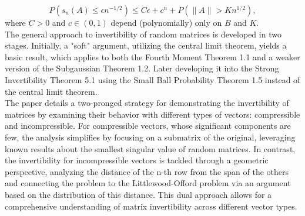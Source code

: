 \[P(s_n(A) \leq \epsilon n^{-1/2}) \leq C\epsilon + c^n + P(\|A\| > K n^{1/2}),\]
where \(C > 0\) and \(c \in (0, 1)\) depend (polynomially) only on \(B\) and \(K\).\\
The general approach to invertibility of random matrices is developed in two stages. Initially, a "soft" argument, utilizing the central limit theorem, yields a basic result, which applies to both the Fourth Moment Theorem 1.1 and a weaker version of the Subgaussian Theorem 1.2. Later developing it into the Strong Invertibility Theorem 5.1 using the Small Ball Probability Theorem 1.5 instead of the central limit theorem.\\
The paper details a two-pronged strategy for demonstrating the invertibility of matrices by examining their behavior with different types of vectors: compressible and incompressible.
For compressible vectors, whose significant components are few, the analysis simplifies by focusing on a submatrix of the original, leveraging known results about the smallest singular value of random matrices.
In contrast, the invertibility for incompressible vectors is tackled through a geometric perspective, analyzing the distance of the n-th row from the span of the others and connecting the problem to the Littlewood-Offord problem via an argument based on the distribution of this distance.
This dual approach allows for a comprehensive understanding of matrix invertibility across different vector types.